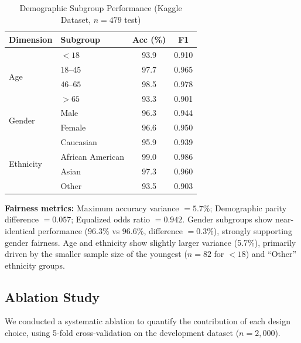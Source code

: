 \documentclass[11pt,a4paper]{article}
\begin{document}
\begin{table}[H]
\centering
\caption{Demographic Subgroup Performance (Kaggle Dataset, $n = 479$ test)}
\label{tab:fairness}
\begin{tabular}{llcc}
\toprule
\textbf{Dimension} & \textbf{Subgroup} & \textbf{Acc (\%)} & \textbf{F1} \\
\midrule
\multirow{4}{*}{Age} & ${<}18$ & 93.9 & 0.910 \\
                     & $18$--$45$ & 97.7 & 0.965 \\
                     & $46$--$65$ & 98.5 & 0.978 \\
                     & ${>}65$ & 93.3 & 0.901 \\
\midrule
\multirow{2}{*}{Gender} & Male   & 96.3 & 0.944 \\
                        & Female & 96.6 & 0.950 \\
\midrule
\multirow{4}{*}{Ethnicity} & Caucasian         & 95.9 & 0.939 \\
                           & African American  & 99.0 & 0.986 \\
                           & Asian             & 97.3 & 0.960 \\
                           & Other             & 93.5 & 0.903 \\
\bottomrule
\end{tabular}
\end{table}

\noindent\textbf{Fairness metrics:} Maximum accuracy variance $= 5.7\%$;
Demographic parity difference $= 0.057$; Equalized odds ratio $= 0.942$.
Gender subgroups show near-identical performance ($96.3\%$ vs $96.6\%$,
difference $= 0.3\%$), strongly supporting gender fairness. Age and ethnicity
show slightly larger variance (5.7\%), primarily driven by the smaller sample
size of the youngest ($n = 82$ for ${<}18$) and ``Other'' ethnicity groups.

\subsection{Ablation Study}

We conducted a systematic ablation to quantify the contribution of each design
choice, using 5-fold cross-validation on the development dataset ($n = 2{,}000$).
\end{document}
